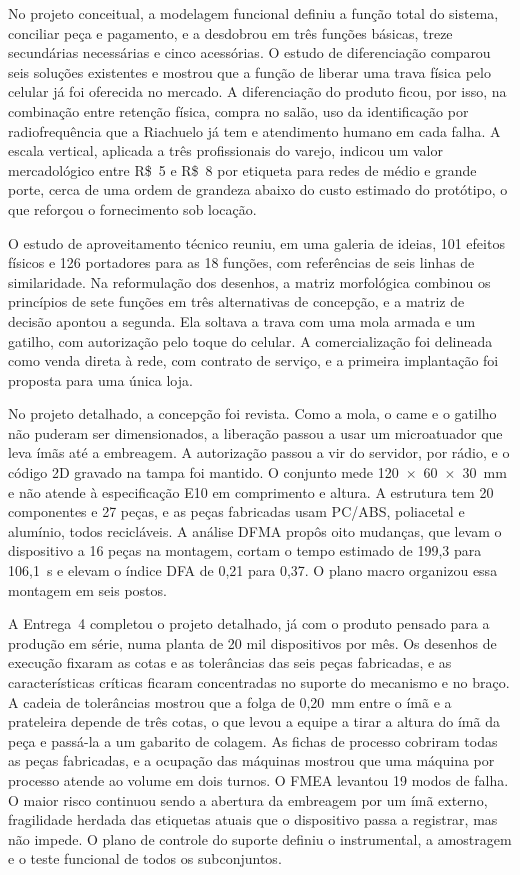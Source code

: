 No projeto conceitual, a modelagem funcional definiu a função total do sistema, conciliar peça e pagamento, e a desdobrou em três funções básicas, treze secundárias necessárias e cinco acessórias. O estudo de diferenciação comparou seis soluções existentes e mostrou que a função de liberar uma trava física pelo celular já foi oferecida no mercado. A diferenciação do produto ficou, por isso, na combinação entre retenção física, compra no salão, uso da identificação por radiofrequência que a Riachuelo já tem e atendimento humano em cada falha. A escala vertical, aplicada a três profissionais do varejo, indicou um valor mercadológico entre R\$~5 e R\$~8 por etiqueta para redes de médio e grande porte, cerca de uma ordem de grandeza abaixo do custo estimado do protótipo, o que reforçou o fornecimento sob locação.

O estudo de aproveitamento técnico reuniu, em uma galeria de ideias, 101 efeitos físicos e 126 portadores para as 18 funções, com referências de seis linhas de similaridade. Na reformulação dos desenhos, a matriz morfológica combinou os princípios de sete funções em três alternativas de concepção, e a matriz de decisão apontou a segunda. Ela soltava a trava com uma mola armada e um gatilho, com autorização pelo toque do celular. A comercialização foi delineada como venda direta à rede, com contrato de serviço, e a primeira implantação foi proposta para uma única loja.

No projeto detalhado, a concepção foi revista. Como a mola, o came e o gatilho não puderam ser dimensionados, a liberação passou a usar um microatuador que leva ímãs até a embreagem. A autorização passou a vir do servidor, por rádio, e o código 2D gravado na tampa foi mantido. O conjunto mede 120~$\times$~60~$\times$~30~mm e não atende à especificação E10 em comprimento e altura. A estrutura tem 20 componentes e 27 peças, e as peças fabricadas usam PC/ABS, poliacetal e alumínio, todos recicláveis. A análise DFMA propôs oito mudanças, que levam o dispositivo a 16 peças na montagem, cortam o tempo estimado de 199,3 para 106,1~s e elevam o índice DFA de 0,21 para 0,37. O plano macro organizou essa montagem em seis postos.

A Entrega~4 completou o projeto detalhado, já com o produto pensado para a produção em série, numa planta de 20 mil dispositivos por mês. Os desenhos de execução fixaram as cotas e as tolerâncias das seis peças fabricadas, e as características críticas ficaram concentradas no suporte do mecanismo e no braço. A cadeia de tolerâncias mostrou que a folga de 0,20~mm entre o ímã e a prateleira depende de três cotas, o que levou a equipe a tirar a altura do ímã da peça e passá-la a um gabarito de colagem. As fichas de processo cobriram todas as peças fabricadas, e a ocupação das máquinas mostrou que uma máquina por processo atende ao volume em dois turnos. O FMEA levantou 19 modos de falha. O maior risco continuou sendo a abertura da embreagem por um ímã externo, fragilidade herdada das etiquetas atuais que o dispositivo passa a registrar, mas não impede. O plano de controle do suporte definiu o instrumental, a amostragem e o teste funcional de todos os subconjuntos.

